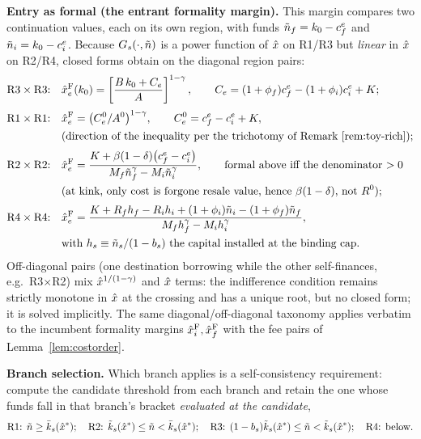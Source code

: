 \documentclass[12pt]{article}
\begin{document}
\textbf{Entry as formal (the entrant formality margin).}
This margin compares two continuation values, each on its own region,
with funds $\tilde{n}_{f}=k_{0}-c^{e}_{f}$ and
$\tilde{n}_{i}=k_{0}-c^{e}_{i}$. Because
$G_{s}(\cdot,\tilde{n})$ is a power function of $\hat{x}$ on
R1/R3 but \emph{linear} in $\hat{x}$ on R2/R4, closed forms obtain
on the diagonal region pairs:
\begin{align}
  \text{R3}\times\text{R3:}\quad
  &\hat{x}^{\mathrm{F}}_{e}(k_{0})=\left[\frac{B\,k_{0}+C_{e}}{A}\right]^{1-\gamma},
  \qquad C_{e}=(1+\phi_{f})c^{e}_{f}
  -(1+\phi_{i})c^{e}_{i}+K;
  \label{eq:app-thEf33}\\[2pt]
  \text{R1}\times\text{R1:}\quad
  &\hat{x}^{\mathrm{F}}_{e}=\big(C^{0}_{e}/A^{0}\big)^{1-\gamma},
  \qquad C^{0}_{e}=c^{e}_{f}-c^{e}_{i}+K,
  \label{eq:app-thEf11}\\
  &\text{(direction of the inequality per the trichotomy of
  Remark~\ref{rem:toy-rich})};\notag\\[2pt]
  \text{R2}\times\text{R2:}\quad
  &\hat{x}^{\mathrm{F}}_{e}=\frac{K+\beta(1-\delta)\big(c^{e}_{f}-c^{e}_{i}\big)}
  {M_{f}\tilde{n}_{f}^{\gamma}
  -M_{i}\tilde{n}_{i}^{\gamma}},
  \qquad\text{formal above iff the denominator $>0$}
  \label{eq:app-thEf22}\\
  &\text{(at kink, only cost is forgone resale value, hence }\beta(1-\delta)\text{, not }R^{0});\notag\\[2pt]
  \text{R4}\times\text{R4:}\quad
  &\hat{x}^{\mathrm{F}}_{e}=\frac{K+R_{f}h_{f}-R_{i}h_{i}
  +(1+\phi_{i})\tilde{n}_{i}
  -(1+\phi_{f})\tilde{n}_{f}}
  {M_{f}h_{f}^{\gamma}-M_{i}h_{i}^{\gamma}},
  \label{eq:app-thEf44}\\
  &\text{with } h_{s}\equiv\tilde{n}_{s}/(1-b_{s})
  \text{ the capital installed at the binding cap}.\notag
\end{align}
Off-diagonal pairs (one destination borrowing while the other
self-finances, e.g.\ R3$\times$R2) mix
$\hat{x}^{1/(1-\gamma)}$ and $\hat{x}$ terms: the indifference
condition remains strictly monotone in $\hat{x}$ at the crossing and
has a unique root, but no closed form; it is solved implicitly. The
same diagonal/off-diagonal taxonomy applies verbatim to the incumbent
formality margins $\hat{x}^{\mathrm{F}}_{i},\hat{x}^{\mathrm{F}}_{f}$ with the fee pairs of
Lemma~\ref{lem:costorder}.

\textbf{Branch selection.}
Which branch applies is a self-consistency requirement: compute the
candidate threshold from each branch and retain the one whose funds
fall in that branch's bracket \emph{evaluated at the candidate},
\begin{equation*}
  \text{R1: }\tilde{n}\geq\bar{k}_{s}(\hat{x}^{*});\quad
  \text{R2: }\tilde{k}_{s}(\hat{x}^{*})\leq\tilde{n}
  <\bar{k}_{s}(\hat{x}^{*});\quad
  \text{R3: }(1-b_{s})\tilde{k}_{s}(\hat{x}^{*})
  \leq\tilde{n}<\tilde{k}_{s}(\hat{x}^{*});\quad
  \text{R4: below.}
\end{equation*}
\end{document}

